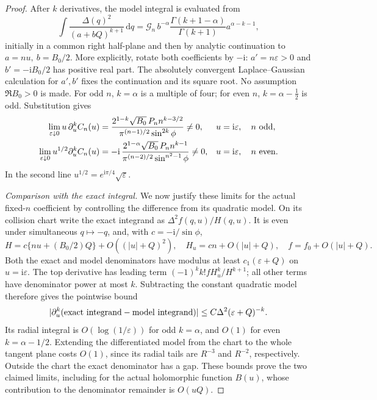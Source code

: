 \documentclass[11pt]{article}
\numberwithin{equation}{section}
\theoremstyle{definition}
\newcommand{\ii}{\mathrm i}
\newcommand{\dd}{\,\mathrm d}
\newcommand{\eps}{\varepsilon}
\begin{document}
\begin{proof}
After \(k\) derivatives, the model integral is evaluated from
\[
 \int\frac{\Delta(q)^2}{(a+bQ)^{k+1}}\dd q
 =\mathcal G_n\,b^{-\alpha}
    \frac{\Gamma(k+1-\alpha)}{\Gamma(k+1)}
    a^{\alpha-k-1},
\]
initially in a common right half-plane and then by analytic
continuation to \(a=nu,\ b=B_0/2\).
More explicitly, rotate both coefficients by \(-\ii\):
\(a'=n\eps>0\) and \(b'=-\ii B_0/2\) has positive real part.
The absolutely convergent Laplace--Gaussian calculation for
\(a',b'\) fixes the continuation and its square root. No assumption
\(\Re B_0>0\) is made.
For odd \(n\), \(k=\alpha\) is a multiple of four; for even
\(n\), \(k=\alpha-\tfrac12\) is odd. Substitution gives
\begin{align}
 \lim_{\eps\downarrow0}u\,\partial_u^k C_n(u)
 &=\frac{2^{1-k}\sqrt{B_0}\,P_n n^{k-3/2}}
         {\pi^{(n-1)/2}\sin^{2k}\phi}\ne0,
 &&u=\ii\eps,\quad n\ {\rm odd},\label{ana:oddamp}\\
 \lim_{\eps\downarrow0}u^{1/2}\partial_u^k C_n(u)
 &=-\ii\,\frac{2^{1-\alpha}\sqrt{B_0}\,P_n n^{k-1}}
         {\pi^{(n-2)/2}\sin^{n^2-1}\phi}\ne0,
 &&u=\ii\eps,\quad n\ {\rm even}.\label{ana:evenamp}
\end{align}
In the second line \(u^{1/2}=e^{\ii\pi/4}\sqrt\eps\).

\emph{Comparison with the exact integral.} We now justify these
limits for the actual fixed-\(n\) coefficient by controlling the
difference from its quadratic model. On its collision chart write the exact integrand as
\(\Delta^2 f(q,u)/H(q,u)\). It is even under simultaneous
\(q\mapsto-q\), and, with \(c=-\ii/\sin\phi\),
\[
 H=c\{nu+(B_0/2)Q\}+O((|u|+Q)^2),\quad
 H_u=cn+O(|u|+Q),\quad f=f_0+O(|u|+Q).
\]
Both the exact and model denominators have modulus at least
\(c_1(\eps+Q)\) on \(u=\ii\eps\). The top derivative has
leading term \((-1)^kk! fH_u^k/H^{k+1}\); all other terms have
denominator power at most \(k\). Subtracting the constant quadratic
model therefore gives the pointwise bound
\[
 |\partial_u^k(\hbox{exact integrand}-\hbox{model integrand})|
       \le C\Delta^2(\eps+Q)^{-k}.
\]
Its radial integral is \(O(\log(1/\eps))\) for odd
\(k=\alpha\), and \(O(1)\) for even \(k=\alpha-1/2\).
Extending the differentiated model from the chart to the whole
tangent plane costs \(O(1)\), since its radial tails are
\(R^{-3}\) and \(R^{-2}\), respectively. Outside the chart the
exact denominator has a gap. These bounds prove the two claimed
limits, including for the actual holomorphic function \(B(u)\),
whose contribution to the denominator remainder is \(O(uQ)\).


\end{proof}
\end{document}
